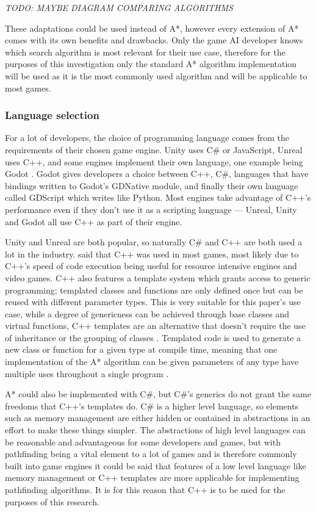 \documentclass[11pt, a4paper]{article}
\begin{document}
\emph{TODO: MAYBE DIAGRAM COMPARING ALGORITHMS}

These adaptations could be used instead of A*, however every extension of A* comes with its own benefits and drawbacks. Only the game AI developer knows which search algorithm is most relevant for their use case, therefore for the purposes of this investigation only the standard A* algorithm implementation will be used as it is the most commonly used algorithm and will be applicable to most games.

\subsubsection{Language selection}
\label{subsubsec:languageSelection}

For a lot of developers, the choice of programming language comes from the requirements of their chosen game engine. Unity \parencite{Unity} uses C\# or JavaScript, Unreal \parencite{Unreal} uses C++, and some engines implement their own language, one example being Godot \parencite{Godot}. Godot gives developers a choice between C++, C\#, languages that have bindings written to Godot's GDNative module, and finally their own language called GDScript which writes like Python. Most engines take advantage of C++'s performance even if they don't use it as a scripting language --- Unreal, Unity and Godot all use C++ as part of their engine. 

Unity \parencite{Unity} and Unreal \parencite{Unreal} are both popular, so naturally C\# and C++ are both used a lot in the industry. \citeauthor{blow2004game} \parencite*[30]{blow2004game} said that C++ was used in most games, most likely due to C++'s speed of code execution being useful for resource intensive engines and video games. C++ also features a template system which grants access to generic programming; templated classes and functions are only defined once but can be reused with different parameter types. This is very suitable for this paper's use case, while a degree of genericness can be achieved through base classes and virtual functions, C++ templates are an alternative that doesn't require the use of inheritance or the grouping of classes \parencite[117]{higgins2002generic}. Templated code is used to generate a new class or function for a given type at compile time, meaning that one implementation of the A* algorithm can be given parameters of any type have multiple uses throughout a single program \parencite[120]{higgins2002generic}.

A* could also be implemented with C\#, but C\#'s generics do not grant the same freedoms that C++'s templates do. C\# is a higher level language, so elements such as memory management are either hidden or contained in abstractions in an effort to make these things simpler. The abstractions of high level languages can be reasonable and advantageous for some developers and games, but with pathfinding being a vital element to a lot of games and is therefore commonly built into game engines it could be said that features of a low level language like memory management or C++ templates are more applicable for implementing pathfinding algorithms. It is for this reason that C++ is to be used for the purposes of this research.
\end{document}
